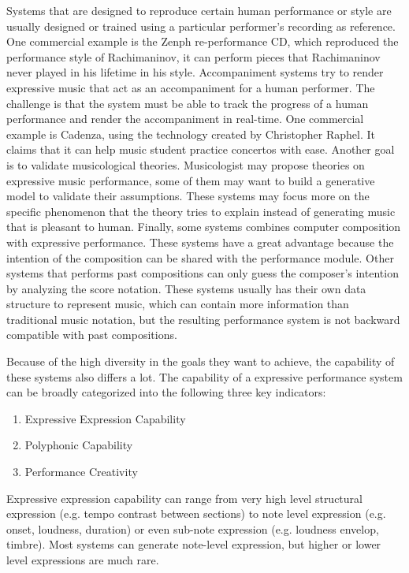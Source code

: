 Systems that are designed to reproduce certain human performance or style are usually designed or trained using a particular performer's recording as reference. One commercial example is the Zenph re-performance CD\cite{zenph}, which reproduced the performance style of Rachimaninov, it can perform pieces that Rachimaninov never played in his lifetime in his style. 
%
%
Accompaniment systems try to render expressive music that act as an accompaniment for a human performer. The challenge is that the system must be able to track the progress of a human performance and render the accompaniment in real-time. One commercial example is Cadenza\cite{cadenza}, using the technology created by Christopher Raphel\cite{chris}. It claims that it can help music student practice concertos with ease.
%
Another goal is to validate musicological theories. Musicologist may propose theories on expressive music performance, some of them may want to build a generative model to validate their assumptions. These systems may focus more on the specific phenomenon that the theory tries to explain instead of generating music that is pleasant to human. 
%
Finally, some systems combines computer composition with expressive performance. These systems have a great advantage because the intention of the composition can be shared with the performance module. Other systems that performs past compositions can only guess the composer's intention by analyzing the score notation. These systems usually has their own data structure to represent music, which can contain more information than traditional music notation, but the resulting performance system is not backward compatible with past compositions.


Because of the high diversity in the goals they want to achieve, the capability of these systems also differs a lot. The capability of a expressive performance system can be broadly categorized into the following three key indicators\cite{THEBOOK}:
\begin{enumerate}
   \item Expressive Expression Capability
   \item Polyphonic Capability
   \item Performance Creativity
\end{enumerate}

Expressive expression capability can range from very high level structural expression (e.g. tempo contrast between sections) to note level expression (e.g. onset, loudness, duration) or even sub-note expression (e.g. loudness envelop, timbre). Most systems can generate note-level expression, but higher or lower level expressions are much rare.

